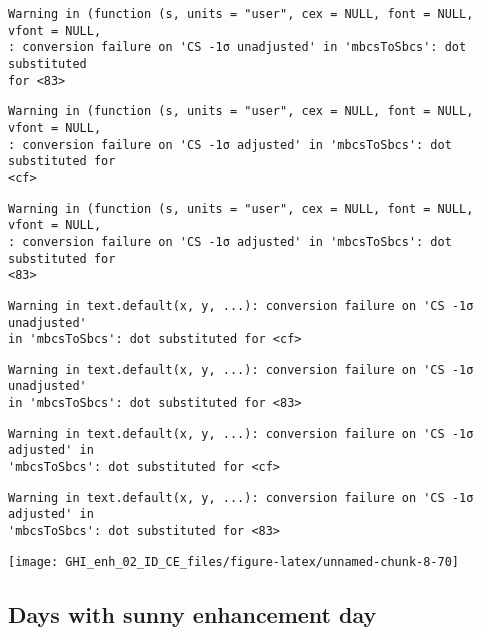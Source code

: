 \documentclass[
  10pt,
  a4paper,oneside]{article}
\begin{document}
\begin{verbatim}
Warning in (function (s, units = "user", cex = NULL, font = NULL, vfont = NULL,
: conversion failure on 'CS -1σ unadjusted' in 'mbcsToSbcs': dot substituted
for <83>
\end{verbatim}

\begin{verbatim}
Warning in (function (s, units = "user", cex = NULL, font = NULL, vfont = NULL,
: conversion failure on 'CS -1σ adjusted' in 'mbcsToSbcs': dot substituted for
<cf>
\end{verbatim}

\begin{verbatim}
Warning in (function (s, units = "user", cex = NULL, font = NULL, vfont = NULL,
: conversion failure on 'CS -1σ adjusted' in 'mbcsToSbcs': dot substituted for
<83>
\end{verbatim}

\begin{verbatim}
Warning in text.default(x, y, ...): conversion failure on 'CS -1σ unadjusted'
in 'mbcsToSbcs': dot substituted for <cf>
\end{verbatim}

\begin{verbatim}
Warning in text.default(x, y, ...): conversion failure on 'CS -1σ unadjusted'
in 'mbcsToSbcs': dot substituted for <83>
\end{verbatim}

\begin{verbatim}
Warning in text.default(x, y, ...): conversion failure on 'CS -1σ adjusted' in
'mbcsToSbcs': dot substituted for <cf>
\end{verbatim}

\begin{verbatim}
Warning in text.default(x, y, ...): conversion failure on 'CS -1σ adjusted' in
'mbcsToSbcs': dot substituted for <83>
\end{verbatim}

\begin{center}\texttt{[image: GHI\_enh\_02\_ID\_CE\_files/figure-latex/unnamed-chunk-8-70]} \end{center}

\FloatBarrier

\hypertarget{days-with-sunny-enhancement-day}{%
\subsection{Days with sunny enhancement day}\label{days-with-sunny-enhancement-day}}
\end{document}
